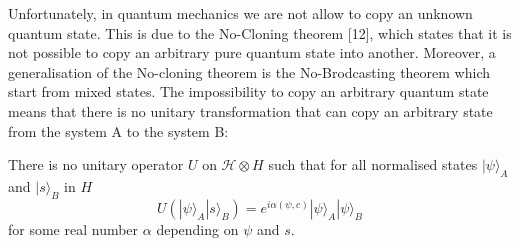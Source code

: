 Unfortunately, in quantum mechanics we are not allow to copy an unknown quantum state. This is due to the No-Cloning theorem [12], which states that it is not possible to copy an arbitrary pure quantum state into another. Moreover, a generalisation of the No-cloning theorem is the No-Brodcasting theorem which start from mixed states.
The impossibility to copy an arbitrary quantum state means that there is no unitary transformation that can copy an arbitrary state from the system A to the system B:
\begin{theorem}
There is no unitary operator $U$ on $\mathcal{H} \otimes H$ such that for all normalised states $|\psi\rangle_{A}$ and $|s\rangle_{B}$ in $H$
$$
U\left(|\psi\rangle_{A}|s\rangle_{B}\right)=e^{i \alpha(\psi, c)}|\psi\rangle_{A}|\psi\rangle_{B}
$$
for some real number $\alpha$ depending on $\psi$ and $s$.
\end{theorem}

